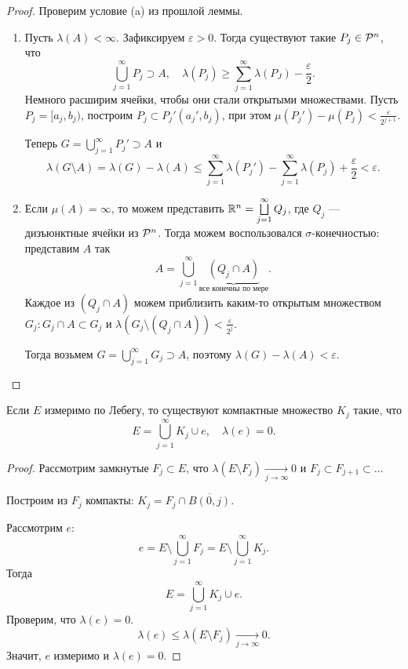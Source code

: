 \begin{proof}
	Проверим условие (a) из прошлой леммы.
	\begin{enumerate}
		\item Пусть $  \lambda (A) < \infty$. Зафиксируем $ \varepsilon  >0$. Тогда существуют такие $ P_j \in \P^{n}$, что
			\[
				\bigcup_{j=1}^{\infty} P_j \supset A, \quad \lambda (P_j) \ge \sum_{j=1}^{\infty} \lambda (P_J) - \frac{\varepsilon}{2}
			.\] 
			Немного расширим ячейки, чтобы они стали открытыми множествами. Пусть $ P_j = [a_j , b_j)$, построим $ P_j \subset P_j' (a_j', b_j)  $,  при этом $ \mu(P_j') - \mu(P_j) < \frac{\varepsilon}{2^{j+1}}$.

			Теперь $ G = \bigcup\limits_{j=1}^{\infty} P_j' \supset A $ и  
			\[
				\lambda (G \setminus A) = \lambda (G) - \lambda (A) \le \sum_{j=1}^{\infty} \lambda (P_j') - \sum_{j=1}^{\infty} \lambda (P_j) + \frac{\varepsilon}{2} < \varepsilon 
			.\] 
		\item Если $  \mu(A) = \infty$, то можем представить $ \R^{n}  = \bigsqcup\limits_{j=1}^{\infty} Q_j$, где $ Q_j$ --- дизъюнктные ячейки из $ \P^{n}$.
			Тогда можем воспользовался $ \sigma $-конечностью: представим $ A$ так
			\[
				A = \bigcup_{j=1}^{\infty} \underbrace{(Q_j \cap A)}_{\text{все конечны по мере}}
			.\] 
			Каждое из $ (Q_j \cap A)$ можем приблизить каким-то открытым множеством $ G_j\colon G_j \cap A \subset G_j$ и $ \lambda (G_j \setminus (Q_j \cap A)) < \frac{\varepsilon}{2^{j}}$. 

			Тогда возьмем $ G = \bigcup\limits_{j=1}^{\infty} G_j \supset A$, поэтому $ \lambda (G) - \lambda (A) < \varepsilon $.
	\end{enumerate} 
\end{proof}
\begin{cor}
    Если $ E$ измеримо по Лебегу, то существуют компактные множество $ K_j $ такие, что \[
		E = \bigcup_{j=1}^{\infty} K_j \cup e, \quad \lambda (e) = 0
    .\] 
\end{cor}
\begin{proof}
	Рассмотрим замкнутые $F_j  \subset E$, что $ \lambda (E \setminus F_j) \underset{j \to  \infty}{\longrightarrow} 0$ и $ F_j \subset F_{j+1} \subset \ldots $

	Построим из $ F_j$ компакты: $ K_j = F_j \cap \overline{B(0, j)}$.

	Рассмотрим $ e$:
	$$
	e  = E \setminus \bigcup\limits_{j=1}^{\infty} F_j = E \setminus \bigcup\limits_{j=1}^{\infty} K_j
	.$$
	Тогда  
	\[
	E = \bigcup_{j=1}^{\infty} K_j \cup e
	.\] 
	Проверим, что $ \lambda (e) = 0$.
	\[
		\lambda (e)  \le \lambda (E \setminus F_j) \underset{j \to \infty}{\longrightarrow} 0
	.\] 
	Значит, $ e$ измеримо и $ \lambda(e) = 0$.
\end{proof}
